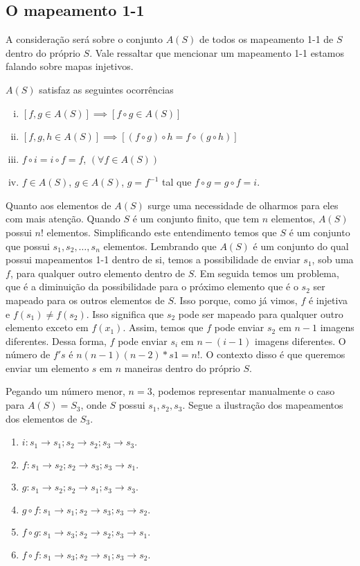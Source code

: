 \subsection{O mapeamento 1-1}
A consideração será sobre o conjunto $A(S)$ de todos os mapeamento 1-1 de $S$ dentro do próprio $S$. Vale ressaltar que mencionar um mapeamento 1-1 estamos falando sobre mapas injetivos.
\begin{lemma}
    $A(S)$ satisfaz as seguintes ocorrências
    \begin{enumerate}[i.]
        \item $\left[f,g \in A(S)\right] \implies \left[f\circ g \in A(S)\right]$
        \item $\left[f,g,h \in A(S)\right] \implies \left[(f\circ g)\circ h = f\circ (g\circ h)\right]$
        \item $f\circ i = i\circ f = f$, $(\forall f \in A(S))$
        \item $f \in A(S)$, $g\in A(S)$, $g=f^{-1}$ tal que $f\circ g= g\circ f = i$.
    \end{enumerate}
\end{lemma}
Quanto aos elementos de $A(S)$ surge uma necessidade de olharmos para eles com mais atenção. Quando $S$ é um conjunto finito, que tem $n$ elementos, $A(S)$ possui $n!$ elementos. Simplificando este entendimento temos que $S$ é um conjunto que possui $s_{1},s_{2},\ldots , s_{n}$ elementos. Lembrando que $A(S)$ é um conjunto do qual possui mapeamentos 1-1 dentro de si, temos a possibilidade de enviar $s_{1}$, sob uma $f$, para qualquer outro elemento dentro de $S$. Em seguida temos um problema, que é a diminuição da possibilidade para o próximo elemento que é o $s_{2}$ ser mapeado para os outros elementos de $S$. Isso porque, como já vimos, $f$ é injetiva e $f(s_{1}) \neq f(s_{2})$. Isso significa que $s_{2}$ pode ser mapeado para qualquer outro elemento exceto em $f(x_{1})$. Assim, temos que $f$ pode enviar $s_{2}$ em $n-1$ imagens diferentes. Dessa forma, $f$ pode enviar $s_{i}$ em $n-(i-1)$ imagens diferentes. O número de $f's$ é $n(n-1)(n-2)*s 1=n!$. O contexto disso é que queremos enviar um elemento $s$ em $n$ maneiras dentro do próprio $S$.
\begin{exmp}
    Pegando um número menor, $n = 3$, podemos representar manualmente o caso para $A(S)=S_{3}$, onde $S$ possui $s_{1},s_{2},s_{3}$. Segue a ilustração dos mapeamentos dos elementos de $S_{3}$.
    \begin{enumerate}[1.]
        \item $i:s_{1} \to s_{1}; s_{2} \to s_{2}; s_{3} \to s_{3}.$
        \item $f:s_{1} \to s_{2}; s_{2} \to s_{3}; s_{3} \to s_{1}.$
        \item $g:s_{1} \to s_{2}; s_{2} \to s_{1}; s_{3} \to s_{3}.$
        \item $g\circ f:s_{1} \to s_{1}; s_{2} \to s_{3}; s_{3} \to s_{2}.$
        \item $f\circ g:s_{1} \to s_{3}; s_{2} \to s_{2}; s_{3} \to s_{1}.$
        \item $f\circ f:s_{1} \to s_{3}; s_{2} \to s_{1}; s_{3} \to s_{2}.$
    \end{enumerate}
\end{exmp}

